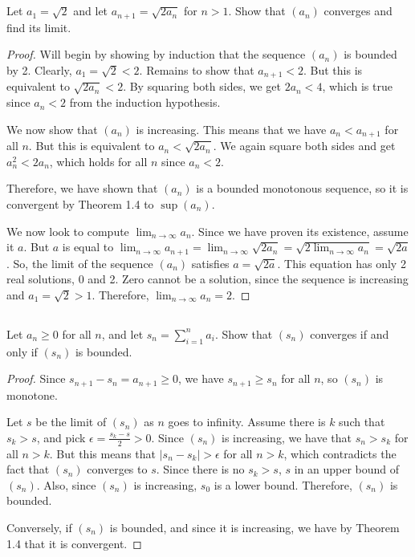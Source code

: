 \subsection{} Let $a_1 = \sqrt{2}$ and let $a_{n+1} = \sqrt{2a_n}$ for $n > 1$. Show that $(a_n)$ converges and find its limit.

\begin{proof}
Will begin by showing by induction that the sequence $(a_n)$ is bounded by 2. Clearly, $a_1=\sqrt{2} < 2$. Remains to show that $a_{n+1}<2$. But this is equivalent to $\sqrt{2a_n} < 2$. By squaring both sides, we get $2a_n < 4$, which is true since $a_n<2$ from the induction hypothesis.

We now show that $(a_n)$ is increasing. This means that we have $a_n < a_{n+1}$ for all $n$. But this is equivalent to $a_n < \sqrt{2a_n}$. We again square both sides and get $a_n^2 < 2a_n$, which holds for all $n$ since $a_n < 2$.

Therefore, we have shown that $(a_n)$ is a bounded monotonous sequence, so it is convergent by Theorem 1.4 to $\sup(a_n)$.

We now look to compute $\lim_{n \rightarrow \infty}{a_n}$. Since we have proven its existence, assume it $a$. But $a$ is equal to $\lim_{n \rightarrow \infty}{a_{n+1}} = \lim_{n \rightarrow \infty}{\sqrt{2a_n}} = \sqrt{2\lim_{n \rightarrow \infty}{a_n}} = \sqrt{2a}$. So, the limit of the sequence $(a_n)$ satisfies $a = \sqrt{2a}$. This equation has only 2 real solutions, 0 and 2. Zero cannot be a solution, since the sequence is increasing and $a_1 = \sqrt{2} > 1$. Therefore, $\lim_{n \rightarrow \infty}{a_n}=2$.

\end{proof}


\subsection{} Let $a_n \geq 0$ for all $n$, and let $s_n = \sum_{i=1}^n a_i$. Show that $(s_n)$ converges if and only if $(s_n)$ is bounded.

\begin{proof}
Since $s_{n+1} - s_n = a_{n+1} \geq 0$, we have $s_{n+1} \geq s_n$ for all $n$, so $(s_n)$ is monotone.

Let $s$ be the limit of $(s_n)$ as $n$ goes to infinity. Assume there is $k$ such that $s_k > s$, and pick $\epsilon = \frac{s_k - s}{2} > 0$. Since $(s_n)$ is increasing, we have that $s_n > s_k$ for all $n > k$. But this means that $|s_n - s_k| > \epsilon$ for all $n>k$, which contradicts the fact that $(s_n)$ converges to $s$. Since there is no $s_k > s$, $s$ in an upper bound of $(s_n)$. Also, since $(s_n)$ is increasing, $s_0$ is a lower bound. Therefore, $(s_n)$ is bounded.

Conversely, if $(s_n)$ is bounded, and since it is increasing, we have by Theorem 1.4 that it is convergent.
\end{proof}

